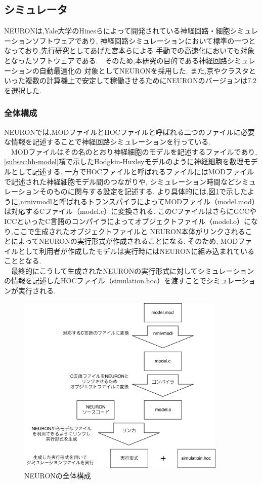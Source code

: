 \subsection{シミュレータ}
\label{subsec:neuron}
NEURONは,Yale大学のHines\cite{NEURON}らによって開発されている神経回路・細胞シミュレーションソフトウェアであり,
神経回路シミュレーションにおいて標準の一つとなっており,先行研究としてあげた宮本\cite{miyamoto-master}\cite{miyamoto-master-eng}らによる
手動での高速化においても対象となったソフトウェアである.　そのため,本研究の目的である神経回路シミュレーションの自動最適化の
対象としてNEURONを採用した. また,京やクラスタといった複数の計算機上で安定して稼働させるためにNEURONのバージョンは7.2を選択した.\\

\subsubsection{全体構成}
NEURONでは,MODファイルとHOCファイルと呼ばれる二つのファイルに必要な情報を記述することで神経回路シミュレーションを行っている.\\
　MODファイルはその名のとおり神経細胞のモデルを記述するファイルであり, \ref{subsec:hh-model}項で示したHodgkin-Huxleyモデルのように神経細胞を数理モデルとして記述する.
一方でHOCファイルと呼ばれるファイルにはMODファイルで記述された神経細胞モデル間のつながりや,
シミュレーション時間などシミュレーションそのものに関与する設定を記述する.
より具体的には,図\ref{fig:neuron}で示したように,nrnivmodlと呼ばれるトランスパイラによってMODファイル（model.mod）は対応するCファイル（model.c）に変換される.
このCファイルはさらにGCCやICCといったC言語のコンパイラによってオブジェクトファイル（model.o）になり,ここで生成されたオブジェクトファイルと
NEURON本体がリンクされることによってNEURONの実行形式が作成されることになる.
そのため, MODファイルとして利用者が作成したモデルは実行時にはNEURONに組み込まれていることとなる.\\
　最終的にこうして生成されたNEURONの実行形式に対してシミュレーションの情報を記述したHOCファイル（simulation.hoc）を渡すことでシミュレーションが実行される.\\
\clearpage
\begin{figure}[htb]
  \begin{center}
    \includegraphics[width=10cm]{./images/neuron}
    \caption{NEURONの全体構成}
    \label{fig:neuron}
  \end{center}
\end{figure}
